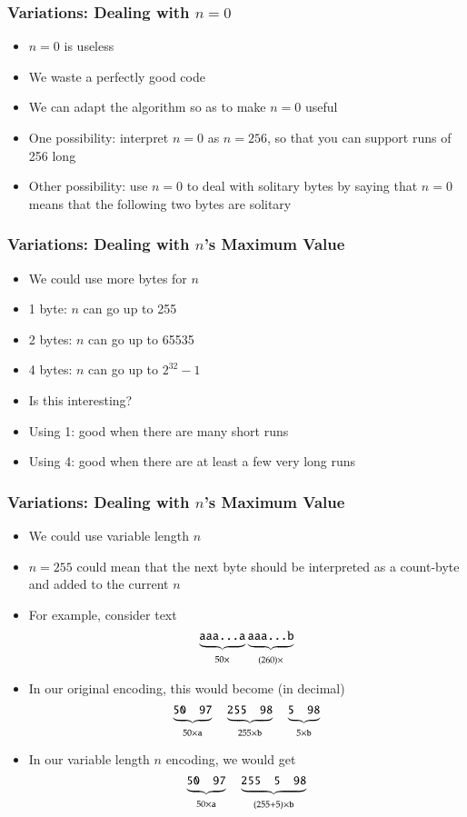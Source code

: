 \begin{frame}
  \frametitle{Variations: Dealing with $n = 0$}
  \begin{itemize}
    \item $n = 0$ is useless
    \item We waste a perfectly good code
    \item We can adapt the algorithm so as to make $n = 0$ useful
    \item One possibility: interpret $n = 0$ as $n = 256$, so that
          you can support runs of 256 long
    \item Other possibility: use $n = 0$ to deal with solitary bytes by
          saying that $n = 0$ means that the following two bytes are solitary
  \end{itemize}
\end{frame}

\begin{frame}
  \frametitle{Variations: Dealing with $n$'s Maximum Value}
  \begin{itemize}
    \item We could use more bytes for $n$
    \item 1 byte: $n$ can go up to 255
    \item 2 bytes: $n$ can go up to 65535
    \item 4 bytes: $n$ can go up to $2^{32}-1$
    \item Is this interesting?
    \item Using 1: good
          when there are many short runs
    \item Using 4: good
          when there are at least a few very long runs
  \end{itemize}
\end{frame}

\begin{frame}
  \frametitle{Variations: Dealing with $n$'s Maximum Value}
  \begin{itemize}
    \item We could use variable length $n$
    \item $n = 255$ could mean that the next byte should be interpreted as a count-byte and added to the current $n$
    \item For example, consider text
          \[
            \underbrace{\texttt{aaa\dots a}}_{50\times}\underbrace{\texttt{aaa\dots b}}_{(260)\times}
          \]
    \item In our original encoding, this would become (in decimal)
          \[
            \underbrace{\tt 50 \quad 97}_{50\times\tt a} \quad \underbrace{\tt 255 \quad 98}_{255\times\tt b} \quad \underbrace{\tt 5 \quad 98}_{5\times\tt b}
          \]
    \item In our variable length $n$ encoding, we would get
          \[
            \underbrace{\tt 50 \quad 97}_{50\times\tt a} \quad \underbrace{\tt 255 \quad 5 \quad 98}_{(255+5)\times\tt b}
          \]
  \end{itemize}
\end{frame}

